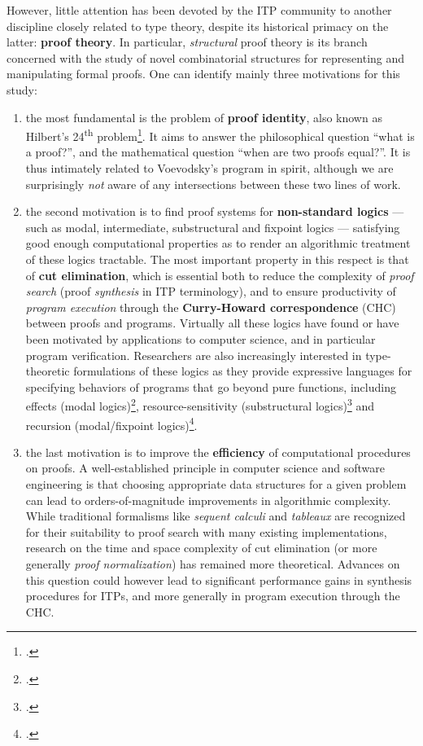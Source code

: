 \documentclass[12pt,draftproposal]{msca-pf}
\begin{document}
However, little attention has been devoted by the ITP community to another discipline closely
related to type theory, despite its historical primacy on the latter: \textbf{proof theory}. In
particular, \emph{structural} proof theory is its branch concerned with the study of novel
combinatorial structures for representing and manipulating formal proofs. One can identify mainly three motivations for this study:
\begin{enumerate}
    \item the most fundamental is the problem of \textbf{proof identity}, also known as Hilbert's
    24\textsuperscript{th} problem\footcite{strasburger-problem-2019}. It aims to answer the
    philosophical question ``what is a proof?'', and the mathematical question ``when are two proofs
    equal?''. It is thus intimately related to Voevodsky's program in spirit, although we are
    surprisingly \emph{not} aware of any intersections between these two lines of work.

    \item the second motivation is to find proof systems for \textbf{non-standard logics} --- such
    as modal, intermediate, substructural and fixpoint logics --- satisfying good enough
    computational properties as to render an algorithmic treatment of these logics tractable. The
    most important property in this respect is that of \textbf{cut elimination}, which is essential
    both to reduce the complexity of \emph{proof search} (proof \emph{synthesis} in ITP
    terminology), and to ensure productivity of \emph{program execution} through the
    \textbf{Curry-Howard correspondence} (CHC) between proofs and programs. Virtually all these
    logics have found or have been motivated by applications to computer science, and in particular
    program verification. Researchers are also increasingly interested in type-theoretic
    formulations of these logics as they provide expressive languages for specifying behaviors of
    programs that go beyond pure functions, including effects (modal
    logics)\footcite{tangModalEffectTypes2025}, resource-sensitivity (substructural
    logics)\footcite{marshallLinearityUniquenessEntente2022} and recursion (modal/fixpoint
    logics)\footcite{cloustonGuardedLambdaCalculusProgramming2017}.
    
    \item the last motivation is to improve the \textbf{efficiency} of computational procedures on
    proofs. A well-established principle in computer science and software engineering is that
    choosing appropriate data structures for a given problem can lead to orders-of-magnitude
    improvements in algorithmic complexity. While traditional formalisms like \emph{sequent calculi}
    and \emph{tableaux} are recognized for their suitability to proof search with many existing
    implementations, research on the time and space complexity of cut elimination (or more generally
    \emph{proof normalization}) has remained more theoretical. Advances on this question could
    however lead to significant performance gains in synthesis procedures for ITPs, and more
    generally in program execution through the CHC.
\end{enumerate}
\end{document}
